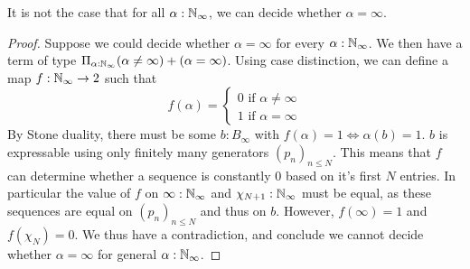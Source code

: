 \documentclass{../util/zariski-small}
\begin{document}
\begin{theorem}
  It is not the case that for all $\alpha:\mathbb{N}_{\infty}$, we can decide whether $\alpha=\infty$.
\end{theorem}
\begin{proof}
  Suppose we could decide whether $\alpha = \infty$ for every $\alpha:\mathbb{N}_{\infty}$. We then have a term of type 
  $\Pi_{\alpha:\mathbb{N}_{\infty}} (\alpha \neq \infty) + (\alpha = \infty)$. 
  Using case distinction, we can define a map $f:\mathbb{N}_{\infty} \to 2$ such that 
  \begin{equation}
    f(\alpha) = \begin{cases} 0 \text{ if } \alpha \neq  \infty
    \\ 1 \text{ if } \alpha = \infty \end{cases} 
  \end{equation}
  By Stone duality, there must be some $b:B_\infty$ with 
  $f(\alpha) = 1 \iff \alpha(b) = 1$.
  $b$ is expressable using only finitely many generators $(p_n)_{n\leq N}$. 
  This means that $f$ can determine whether a sequence is constantly $0$ based on it's first $N$ entries. 
  In particular the value of $f$ on $\infty:\mathbb{N}_{\infty}$ and $\chi_{N+1}:\mathbb{N}_{\infty}$ must be equal, 
  as these sequences are equal on $(p_n)_{n\leq N}$ and thus on $b$. 
  However, $f(\infty) = 1$ and $f(\chi_N) = 0$. 
  We thus have a contradiction, and conclude we cannot decide whether $\alpha = \infty$ for general $\alpha:\mathbb{N}_{\infty}$. 
\end{proof}
\end{document}
